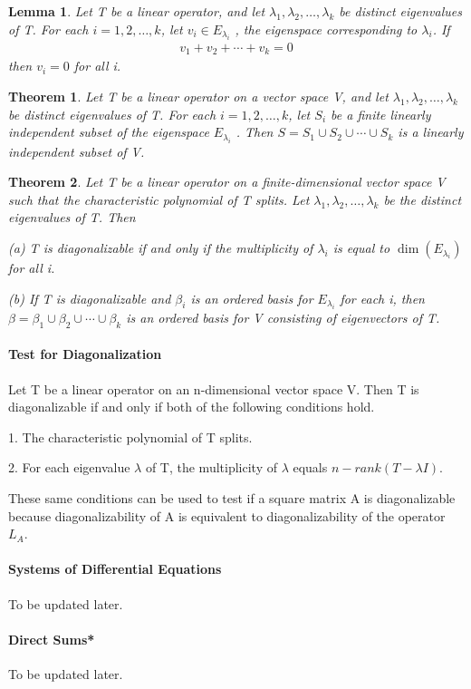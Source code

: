 \documentclass{article}
\theoremstyle{plain}
\newtheorem{theorem}{Theorem}[section]
\newtheorem*{lemma1}{Lemma}
\theoremstyle{plain} %
\begin{document}
\begin{lemma1}
  Let T be a linear operator, and let $\lambda_1, \lambda_2,\ldots,\lambda_k$ be distinct eigenvalues of T. For each $i = 1, 2,\ldots,k$, let $v_i \in E_{\lambda_i}$ , the eigenspace corresponding to $\lambda_i$. If
  \begin{align*}
    v_1+v_2+\cdots+v_k=0
  \end{align*}
  then $v_i = 0$ for all i.
\end{lemma1}

\begin{theorem}
  Let T be a linear operator on a vector space V, and let $\lambda_1, \lambda_2,\ldots,\lambda_k$ be distinct eigenvalues of T. For each $i = 1, 2,\ldots,k$, let $S_i$ be a finite linearly independent subset of the eigenspace $E_{\lambda_i}$ . Then $S = S_1 \cup S_2 \cup\cdots \cup S_k$ is a linearly independent subset of V.
\end{theorem}

\begin{theorem}
  Let T be a linear operator on a finite-dimensional vector space V such that the characteristic polynomial of T splits. Let $\lambda_1, \lambda_2,\ldots,\lambda_k$ be the distinct eigenvalues of T. Then 
  
  (a) T is diagonalizable if and only if the multiplicity of $\lambda_i$ is equal to $\dim(E_{\lambda_i})$ for all i.

  (b) If T is diagonalizable and $\beta_i$ is an ordered basis for $E_{\lambda_i}$ for each i, then $\beta = \beta_1\cup \beta_2\cup\cdots \cup\beta_k$ is an ordered basis for V consisting of eigenvectors of T.
\end{theorem}

\paragraph{Test for Diagonalization}

Let T be a linear operator on an n-dimensional vector space V. Then T is diagonalizable if and only if both of the following conditions hold.

1. The characteristic polynomial of T splits.

2. For each eigenvalue $\lambda$ of T, the multiplicity of $\lambda$ equals $n−rank(T−\lambda I)$.

These same conditions can be used to test if a square matrix A is diagonalizable because diagonalizability of A is equivalent to diagonalizability of the operator $L_A$.

\paragraph{Systems of Differential Equations}

To be updated later.

\paragraph{Direct Sums*}

To be updated later.
\end{document}
